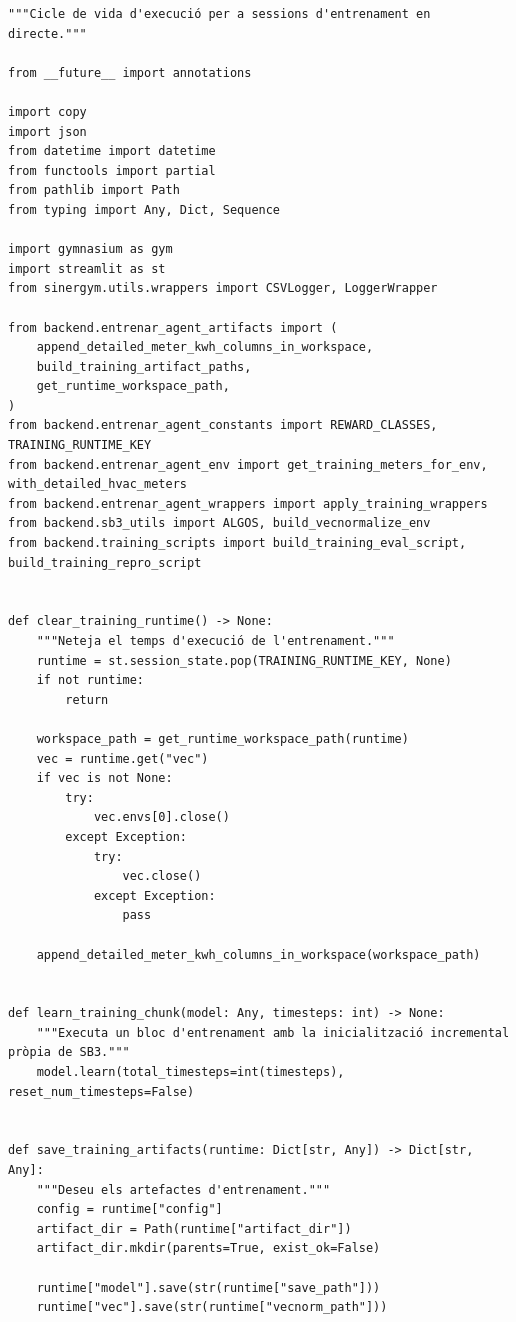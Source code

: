 \documentclass[10pt,a4paper]{article}
\begin{document}
\begin{lstlisting}[style=studioPython,caption={backend/entrenar\_agent\_runtime.py},label={lst:backend-entrenar-agent-runtime-py}]
"""Cicle de vida d'execució per a sessions d'entrenament en directe."""

from __future__ import annotations

import copy
import json
from datetime import datetime
from functools import partial
from pathlib import Path
from typing import Any, Dict, Sequence

import gymnasium as gym
import streamlit as st
from sinergym.utils.wrappers import CSVLogger, LoggerWrapper

from backend.entrenar_agent_artifacts import (
    append_detailed_meter_kwh_columns_in_workspace,
    build_training_artifact_paths,
    get_runtime_workspace_path,
)
from backend.entrenar_agent_constants import REWARD_CLASSES, TRAINING_RUNTIME_KEY
from backend.entrenar_agent_env import get_training_meters_for_env, with_detailed_hvac_meters
from backend.entrenar_agent_wrappers import apply_training_wrappers
from backend.sb3_utils import ALGOS, build_vecnormalize_env
from backend.training_scripts import build_training_eval_script, build_training_repro_script


def clear_training_runtime() -> None:
    """Neteja el temps d'execució de l'entrenament."""
    runtime = st.session_state.pop(TRAINING_RUNTIME_KEY, None)
    if not runtime:
        return

    workspace_path = get_runtime_workspace_path(runtime)
    vec = runtime.get("vec")
    if vec is not None:
        try:
            vec.envs[0].close()
        except Exception:
            try:
                vec.close()
            except Exception:
                pass

    append_detailed_meter_kwh_columns_in_workspace(workspace_path)


def learn_training_chunk(model: Any, timesteps: int) -> None:
    """Executa un bloc d'entrenament amb la inicialització incremental pròpia de SB3."""
    model.learn(total_timesteps=int(timesteps), reset_num_timesteps=False)


def save_training_artifacts(runtime: Dict[str, Any]) -> Dict[str, Any]:
    """Deseu els artefactes d'entrenament."""
    config = runtime["config"]
    artifact_dir = Path(runtime["artifact_dir"])
    artifact_dir.mkdir(parents=True, exist_ok=False)

    runtime["model"].save(str(runtime["save_path"]))
    runtime["vec"].save(str(runtime["vecnorm_path"]))


\end{lstlisting}
\end{document}

